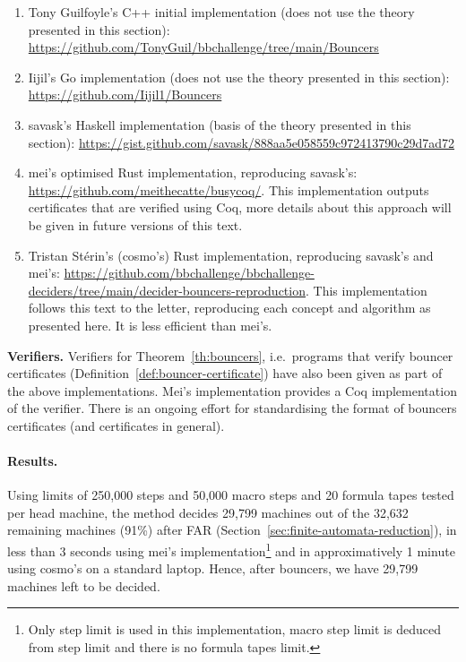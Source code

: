 \begin{enumerate}
    \item Tony Guilfoyle's C++ initial implementation (does not use the theory presented in this section): \url{https://github.com/TonyGuil/bbchallenge/tree/main/Bouncers}
    \item Iijil's Go implementation (does not use the theory presented in this section): \url{https://github.com/Iijil1/Bouncers}
    \item savask's Haskell implementation (basis of the theory presented in this section): \url{https://gist.github.com/savask/888aa5e058559c972413790c29d7ad72}
    \item mei's optimised Rust implementation, reproducing savask's: \url{https://github.com/meithecatte/busycoq/}. This implementation outputs certificates that are verified using Coq, more details about this approach will be given in future versions of this text.
    \item Tristan Stérin's (cosmo's) Rust implementation, reproducing savask's and mei's: \url{https://github.com/bbchallenge/bbchallenge-deciders/tree/main/decider-bouncers-reproduction}. This implementation follows this text to the letter, reproducing each concept and algorithm as presented here. It is less efficient than mei's.


\end{enumerate}


\textbf{Verifiers.} Verifiers for Theorem~\ref{th:bouncers}, i.e.\ programs that verify bouncer certificates (Definition~\ref{def:bouncer-certificate}) have also been given as part of the above implementations. Mei's implementation provides a Coq implementation of the verifier. There is an ongoing effort for standardising the format of bouncers certificates (and certificates in general).

\paragraph*{Results.} Using limits of 250,000 steps and 50,000 macro steps and 20 formula tapes tested per head machine, the method decides 29,799 machines out of the 32,632 remaining machines (91\%) after FAR (Section~\ref{sec:finite-automata-reduction}), in less than 3 seconds using mei's implementation\footnote{Only step limit is used in this implementation, macro step limit is deduced from step limit and there is no formula tapes limit.} and in approximatively 1 minute using cosmo's on a standard laptop. Hence, after bouncers, we have 29,799 machines left to be decided.


